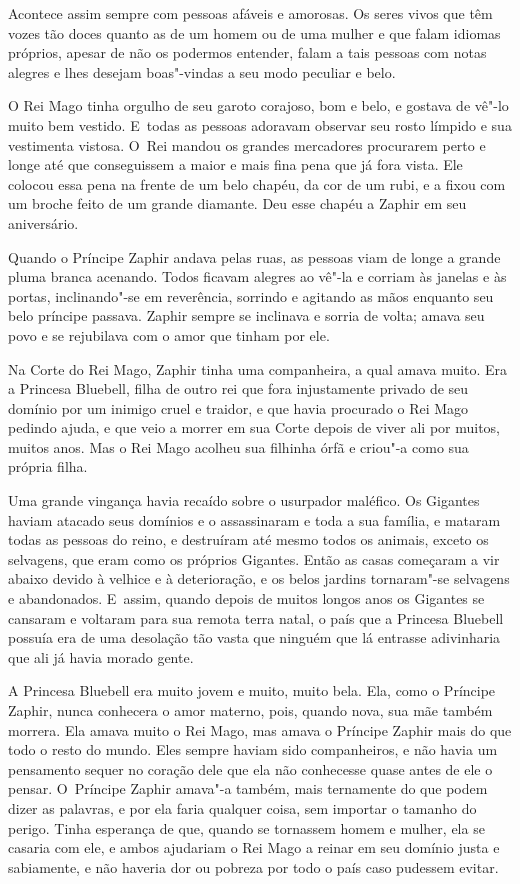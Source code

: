 Acontece assim sempre com pessoas afáveis e amorosas. Os seres vivos que
têm vozes tão doces quanto as de um homem ou de uma mulher e que falam
idiomas próprios, apesar de não os podermos entender, falam a tais
pessoas com notas alegres e lhes desejam boas"-vindas a seu modo
peculiar e belo.

O Rei Mago tinha orgulho de seu garoto corajoso, bom e belo, e gostava
de vê"-lo muito bem vestido. E~todas as pessoas adoravam observar seu
rosto límpido e sua vestimenta vistosa. O~Rei mandou os grandes
mercadores procurarem perto e longe até que conseguissem a maior e mais
fina pena que já fora vista. Ele colocou essa pena na frente de um belo
chapéu, da cor de um rubi, e a fixou com um broche feito de um grande
diamante. Deu esse chapéu a Zaphir em seu aniversário.

Quando o Príncipe Zaphir andava pelas ruas, as pessoas viam de longe
a grande pluma branca acenando. Todos ficavam alegres ao vê"-la
e corriam às janelas e às portas, inclinando"-se em reverência, sorrindo
e agitando as mãos enquanto seu belo príncipe passava. Zaphir sempre se
inclinava e sorria de volta; amava seu povo e se rejubilava com o
amor que tinham por ele.

Na Corte do Rei Mago, Zaphir tinha uma companheira, a qual amava
muito. Era a Princesa Bluebell, filha de outro rei que fora injustamente
privado de seu domínio por um inimigo cruel e traidor, e que havia
procurado o Rei Mago pedindo ajuda, e que veio a morrer em sua Corte depois
de viver ali por muitos, muitos anos. Mas o Rei Mago acolheu sua
filhinha órfã e criou"-a como sua própria filha.

Uma grande vingança havia recaído sobre o usurpador maléfico. Os
Gigantes haviam atacado seus domínios e o assassinaram e toda a sua
família, e mataram todas as pessoas do reino, e destruíram até mesmo
todos os animais, exceto os selvagens, que eram como os próprios
Gigantes. Então as casas começaram a vir abaixo devido à velhice e à
deterioração, e os belos jardins tornaram"-se selvagens e abandonados. E~assim, quando depois de muitos longos anos os Gigantes se cansaram e
voltaram para sua remota terra natal, o país que a Princesa Bluebell
possuía era de uma desolação tão vasta que ninguém que lá entrasse adivinharia
que ali já havia morado gente.

A Princesa Bluebell era muito jovem e muito, muito bela. Ela, como o
Príncipe Zaphir, nunca conhecera o amor materno, pois, quando nova, sua
mãe também morrera. Ela amava muito o Rei Mago, mas amava o Príncipe
Zaphir mais do que todo o resto do mundo. Eles sempre haviam sido
companheiros, e não havia um pensamento sequer no coração dele que ela
não conhecesse quase antes de ele o pensar. O~Príncipe Zaphir amava"-a
também, mais ternamente do que podem dizer as palavras, e por ela
faria qualquer coisa, sem importar o tamanho do perigo. Tinha
esperança de que, quando se tornassem homem e mulher, ela se casaria com
ele, e ambos ajudariam o Rei Mago a reinar em seu domínio justa e
sabiamente, e não haveria dor ou pobreza por todo o país caso
pudessem evitar.

